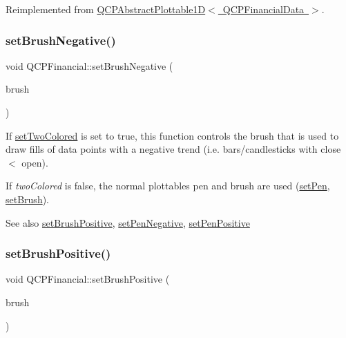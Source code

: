 Reimplemented from \mbox{\hyperlink{class_q_c_p_abstract_plottable1_d_ac385c38a79e419ed3600c2ee398fd216}{Q\+C\+P\+Abstract\+Plottable1\+D$<$ Q\+C\+P\+Financial\+Data $>$}}.

\mbox{\label{class_q_c_p_financial_a8bbdd87629f9144b3ef51af660c0961a}} 
\subsubsection{\texorpdfstring{set\+Brush\+Negative()}{setBrushNegative()}}
{\footnotesize\ttfamily void Q\+C\+P\+Financial\+::set\+Brush\+Negative (\begin{DoxyParamCaption}\item[{const Q\+Brush \&}]{brush }\end{DoxyParamCaption})}

If \mbox{\hyperlink{class_q_c_p_financial_a138e44aac160a17a9676652e240c5f08}{set\+Two\+Colored}} is set to true, this function controls the brush that is used to draw fills of data points with a negative trend (i.\+e. bars/candlesticks with close $<$ open).

If {\itshape two\+Colored} is false, the normal plottable\textquotesingle{}s pen and brush are used (\mbox{\hyperlink{class_q_c_p_abstract_plottable_ab74b09ae4c0e7e13142fe4b5bf46cac7}{set\+Pen}}, \mbox{\hyperlink{class_q_c_p_abstract_plottable_a7a4b92144dca6453a1f0f210e27edc74}{set\+Brush}}).

\begin{DoxySeeAlso}{See also}
\mbox{\hyperlink{class_q_c_p_financial_a5ebff2b1764efd07cc44942e67821829}{set\+Brush\+Positive}}, \mbox{\hyperlink{class_q_c_p_financial_afe5c07e94ccea01a75b3a2476993c346}{set\+Pen\+Negative}}, \mbox{\hyperlink{class_q_c_p_financial_ac58aa3adc7a35aab0088764b840683e5}{set\+Pen\+Positive}} 
\end{DoxySeeAlso}
\mbox{\label{class_q_c_p_financial_a5ebff2b1764efd07cc44942e67821829}} 
\subsubsection{\texorpdfstring{set\+Brush\+Positive()}{setBrushPositive()}}
{\footnotesize\ttfamily void Q\+C\+P\+Financial\+::set\+Brush\+Positive (\begin{DoxyParamCaption}\item[{const Q\+Brush \&}]{brush }\end{DoxyParamCaption})}

